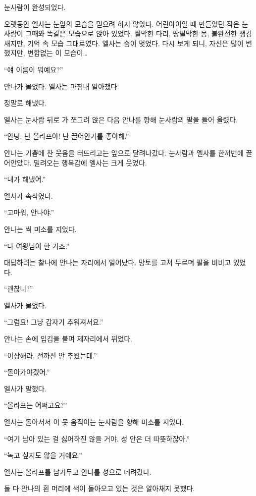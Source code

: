 눈사람이 완성되었다.

오랫동안 엘사는 눈앞의 모습을 믿으려 하지 않았다. 어린아이일 때 만들었던 작은 눈사람이 그때와 똑같은 모습으로 앉아 있었다. 짤막한 다리, 땅딸막한 몸, 불완전한 생김새지만, 기억 속 모습 그대로였다. 엘사는 숨이 멎었다. 다시 보게 되니, 자신은 많이 변했지만, 변함없는 이 모습이\ldots

``얘 이름이 뭐예요?''

안나가 물었다. 엘사는 마침내 알아챘다.

정말로 해냈다.

엘사는 눈사람 뒤로 가 쪼그려 앉은 다음 안나를 향해 눈사람의 팔을 들어 올렸다.

``안녕, 난 올라프야! 난 끌어안기를 좋아해.''

안나는 기쁨에 찬 웃음을 터뜨리고는 앞으로 달려나갔다. 눈사람과 엘사를 한꺼번에 끌어안았다. 밀려오는 행복감에 엘사는 크게 웃었다.

``내가 해냈어.''

엘사가 속삭였다.

``고마워, 안나야.''

안나는 씩 미소를 지었다.

``다 여왕님이 한 거죠.''

대답하려는 찰나에 안나는 자리에서 일어났다. 망토를 고쳐 두르며 팔을 비비고 있었다.

``괜찮니?''

엘사가 물었다.

``그럼요! 그냥 갑자기 추워져서요.''

안나는 손에 입김을 불며 제자리에서 뛰었다.

``이상해라. 전까진 안 추웠는데.''

``돌아가야겠어.''

엘사가 말했다.

``올라프는 어쩌고요?''

엘사는 돌아서서 이 못 움직이는 눈사람을 향해 미소를 지었다.

``여기 남아 있는 걸 싫어하진 않을 거야. 성 안은 더 따뜻하잖아.''

``녹고 싶지도 않을 거예요.''

엘사는 올라프를 남겨두고 안나를 성으로 데려갔다.

둘 다 안나의 흰 머리에 색이 돌아오고 있는 것은 알아채지 못했다.

